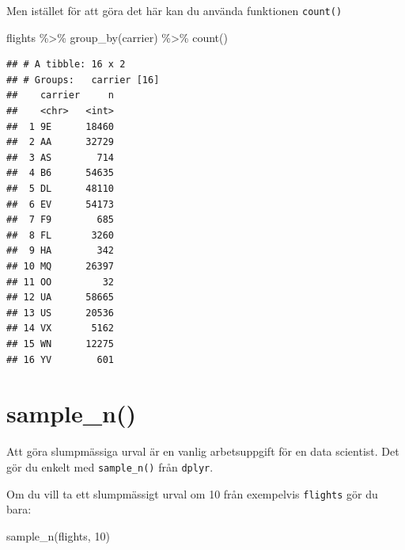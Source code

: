 \documentclass[
]{book}
\newenvironment{Shaded}{\begin{snugshade}}{\end{snugshade}}
\newcommand{\DecValTok}[1]{\textcolor[rgb]{0.00,0.00,0.81}{#1}}
\newcommand{\FunctionTok}[1]{\textcolor[rgb]{0.00,0.00,0.00}{#1}}
\newcommand{\NormalTok}[1]{#1}
\newcommand{\SpecialCharTok}[1]{\textcolor[rgb]{0.00,0.00,0.00}{#1}}
\begin{document}
Men istället för att göra det här kan du använda funktionen \texttt{count()}

\begin{Shaded}
\begin{Highlighting}[]
\NormalTok{flights }\SpecialCharTok{\%\textgreater{}\%}
  \FunctionTok{group\_by}\NormalTok{(carrier) }\SpecialCharTok{\%\textgreater{}\%}
  \FunctionTok{count}\NormalTok{()}
\end{Highlighting}
\end{Shaded}

\begin{verbatim}
## # A tibble: 16 x 2
## # Groups:   carrier [16]
##    carrier     n
##    <chr>   <int>
##  1 9E      18460
##  2 AA      32729
##  3 AS        714
##  4 B6      54635
##  5 DL      48110
##  6 EV      54173
##  7 F9        685
##  8 FL       3260
##  9 HA        342
## 10 MQ      26397
## 11 OO         32
## 12 UA      58665
## 13 US      20536
## 14 VX       5162
## 15 WN      12275
## 16 YV        601
\end{verbatim}

\hypertarget{sample_n}{%
\section{sample\_n()}\label{sample_n}}

Att göra slumpmässiga urval är en vanlig arbetsuppgift för en data scientist. Det gör du enkelt med \texttt{sample\_n()} från \texttt{dplyr}.

Om du vill ta ett slumpmässigt urval om 10 från exempelvis \texttt{flights} gör du bara:

\begin{Shaded}
\begin{Highlighting}[]
\FunctionTok{sample\_n}\NormalTok{(flights, }\DecValTok{10}\NormalTok{)}
\end{Highlighting}
\end{Shaded}
\end{document}
